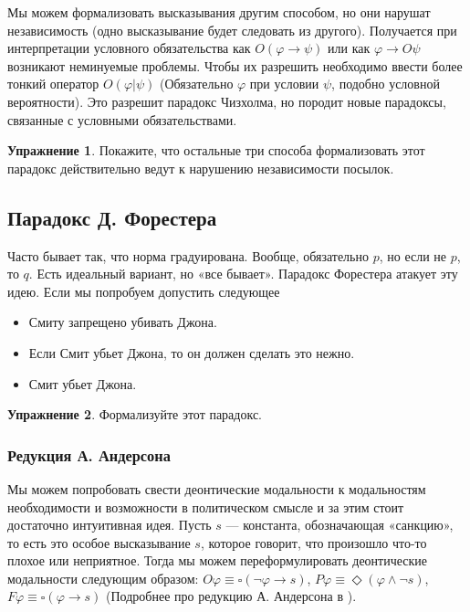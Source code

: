 \documentclass[openany]{book}
\theoremstyle{plain}
\theoremstyle{definition}
\newtheorem{xrc}{Упражнение}[]
\begin{document}
Мы можем формализовать высказывания другим способом, но они нарушат независимость (одно высказывание будет следовать из другого). Получается при интерпретации условного обязательства как \(O (\varphi \to \psi)\) или как \(\varphi \to O \psi\) возникают неминуемые проблемы. Чтобы их разрешить необходимо ввести более тонкий оператор \(O(\varphi | \psi)\) (Обязательно \(\varphi\) при условии \(\psi\), подобно условной вероятности). Это разрешит парадокс Чизхолма, но породит новые парадоксы, связанные с условными обязательствами. 

\begin{xrc}
    Покажите, что остальные три способа формализовать этот парадокс действительно ведут к нарушению независимости посылок.
\end{xrc}

\subsection{Парадокс Д. Форестера}
Часто бывает так, что норма градуирована. Вообще, обязательно \(p\), но если не \(p\), то \(q\). Есть идеальный вариант, но «все бывает». Парадокс Форестера атакует эту идею. Если мы попробуем допустить следующее

\begin{itemize}
    \item{Смиту запрещено убивать Джона.}
    \item{Если Смит убьет Джона, то он должен сделать это нежно.}
    \item{Смит убьет Джона.}
\end{itemize}

\begin{xrc}
    Формализуйте этот парадокс.
\end{xrc}

\subsubsection{Редукция А. Андерсона}
Мы можем попробовать свести деонтические модальности к модальностям необходимости и возможности в политическом смысле и за этим стоит достаточно интуитивная идея. Пусть \(s\) --- константа, обозначающая «санкцию», то есть это особое высказывание \(s\), которое говорит, что произошло что-то плохое или неприятное. Тогда мы можем переформулировать деонтические модальности следующим образом: \(O \varphi \equiv \square (\neg \varphi \to s)\), \(P \varphi \equiv \Diamond (\varphi \land \neg s)\), \(F \varphi \equiv \square (\varphi \to s)\) (Подробнее про редукцию А. Андерсона в \cite{Anderson}). 
\end{document}

